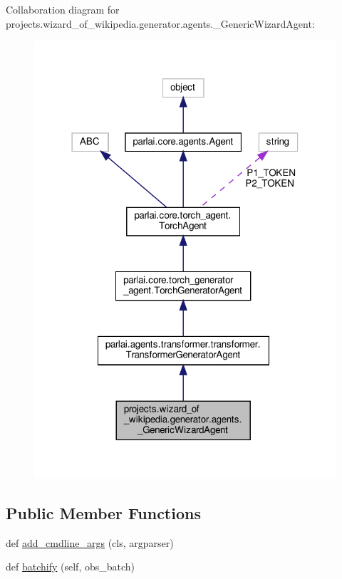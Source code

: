 Collaboration diagram for projects.\+wizard\+\_\+of\+\_\+wikipedia.\+generator.\+agents.\+\_\+\+Generic\+Wizard\+Agent\+:
\nopagebreak
\begin{figure}[H]
\begin{center}
\leavevmode
\includegraphics[width=318pt]{dc/d24/classprojects_1_1wizard__of__wikipedia_1_1generator_1_1agents_1_1__GenericWizardAgent__coll__graph}
\end{center}
\end{figure}
\subsection*{Public Member Functions}
\begin{DoxyCompactItemize}
\item 
def \hyperlink{classprojects_1_1wizard__of__wikipedia_1_1generator_1_1agents_1_1__GenericWizardAgent_a09eb1c8f228b2d4fa8030466e86d0b59}{add\+\_\+cmdline\+\_\+args} (cls, argparser)
\item 
def \hyperlink{classprojects_1_1wizard__of__wikipedia_1_1generator_1_1agents_1_1__GenericWizardAgent_a898b6da1e93aa458966616f0208681fc}{batchify} (self, obs\+\_\+batch)
\end{DoxyCompactItemize}
